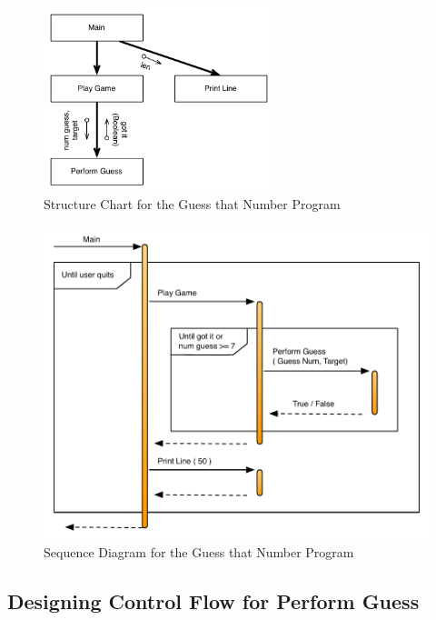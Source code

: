 \begin{figure}[htbp]
   \centering
   \includegraphics[width=0.6\textwidth]{./topics/control-flow/diagrams/GuessThatNumStructure} 
   \caption{Structure Chart for the Guess that Number Program}
   \label{fig:guess-game-structure}
\end{figure}

\begin{figure}[htbp]
   \centering
   \includegraphics[width=\textwidth]{./topics/control-flow/diagrams/GuessThatNumSeq} 
   \caption{Sequence Diagram for the Guess that Number Program}
   \label{fig:guess-game-seq}
\end{figure}

\clearpage
\subsection{Designing Control Flow for Perform Guess} %
\label{sub:designing_control_flow_for_perform_guess}

